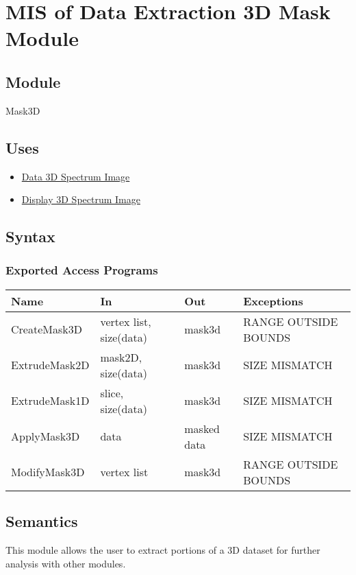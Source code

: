 \documentclass[12pt, titlepage]{article}
\begin{document}
\section{MIS of Data Extraction 3D Mask Module} \label{Mod:Mask3D}

\subsection{Module}

Mask3D

\subsection{Uses}
\begin{itemize}
    \item \hyperref[Mod:SI]{Data 3D Spectrum Image}
    \item \hyperref[Mod:Disp3D]{Display 3D Spectrum Image}
\end{itemize}

\subsection{Syntax}

\subsubsection{Exported Access Programs}

\begin{center}
    \begin{tabular}{p{3cm} p{4cm} p{4cm} p{4cm}}
        \hline
        \textbf{Name} & \textbf{In} & \textbf{Out} & \textbf{Exceptions} \\
        \hline
        CreateMask3D & vertex list, size(data) & mask3d & RANGE OUTSIDE BOUNDS \\
        ExtrudeMask2D & mask2D, size(data) & mask3d & SIZE MISMATCH \\
        ExtrudeMask1D & slice, size(data) & mask3d & SIZE MISMATCH \\
        ApplyMask3D & data & masked data & SIZE MISMATCH \\
        ModifyMask3D & vertex list & mask3d & RANGE OUTSIDE BOUNDS \\
        \hline
    \end{tabular}
\end{center}

\subsection{Semantics}
This module allows the user to extract portions of a 3D dataset for further
analysis with other modules.
\end{document}
